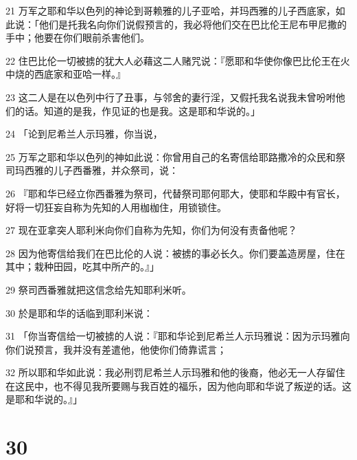 \par 21 万军之耶和华以色列的神论到哥赖雅的儿子亚哈，并玛西雅的儿子西底家，如此说：「他们是托我名向你们说假预言的，我必将他们交在巴比伦王尼布甲尼撒的手中；他要在你们眼前杀害他们。
\par 22 住巴比伦一切被掳的犹大人必藉这二人赌咒说：『愿耶和华使你像巴比伦王在火中烧的西底家和亚哈一样。』
\par 23 这二人是在以色列中行了丑事，与邻舍的妻行淫，又假托我名说我未曾吩咐他们的话。知道的是我，作见证的也是我。这是耶和华说的。」
\par 24 「论到尼希兰人示玛雅，你当说，
\par 25 万军之耶和华以色列的神如此说：你曾用自己的名寄信给耶路撒冷的众民和祭司玛西雅的儿子西番雅，并众祭司，说：
\par 26 『耶和华已经立你西番雅为祭司，代替祭司耶何耶大，使耶和华殿中有官长，好将一切狂妄自称为先知的人用枷枷住，用锁锁住。
\par 27 现在亚拿突人耶利米向你们自称为先知，你们为何没有责备他呢？
\par 28 因为他寄信给我们在巴比伦的人说：被掳的事必长久。你们要盖造房屋，住在其中；栽种田园，吃其中所产的。』」
\par 29 祭司西番雅就把这信念给先知耶利米听。
\par 30 於是耶和华的话临到耶利米说：
\par 31 「你当寄信给一切被掳的人说：『耶和华论到尼希兰人示玛雅说：因为示玛雅向你们说预言，我并没有差遣他，他使你们倚靠谎言；
\par 32 所以耶和华如此说：我必刑罚尼希兰人示玛雅和他的後裔，他必无一人存留住在这民中，也不得见我所要赐与我百姓的福乐，因为他向耶和华说了叛逆的话。这是耶和华说的。』」

\chapter{30}

